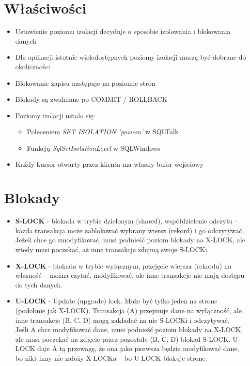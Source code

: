 \documentclass[a4paper,twoside]{article}
\begin{document}
  \section*{Właściwości}
      \begin{itemize}
      \item Ustawienie poziomu izolacji decyduje o sposobie izolowania i blokowania danych 
      \item Dla aplikacji istotnie wielodostępnych poziomy izolacji muszą być dobrane do okoliczności 
      \item Blokowanie zapisu następuje na poziomie stron 
      \item Blokady są zwalniane po COMMIT / ROLLBACK 
      \item Poziomy izolacji ustala się:
      \begin{itemize}
          \item Poleceniem \emph{SET ISOLATION 'poziom'} w SQLTalk 
          \item Funkcją \emph{SqlSetIsolationLevel} w SQLWindows
      \end{itemize}
      \item Każdy kursor otwarty przez klienta ma własny bufor wejściowy
      \end{itemize}

  \section*{Blokady}				
      \begin{itemize}
      \item \textbf{S-LOCK} - blokada w trybie dzielonym (shared), współdzielenie odczytu – każda transakcja może zablokować wybrany wiersz (rekord) i go odczytywać, Jeżeli chce go zmodyfikować, musi podnieść poziom blokady na X-LOCK, ale wtedy musi poczekać, aż inne transakcje zdejmą swoje S-LOCKi.
      \item \textbf{X-LOCK} - blokada w trybie wyłącznym, przejęcie wiersza (rekordu) na własność – można czytać, modyfikować, ale inne transakcje nie mają dostępu do tych danych.
      \item \textbf{U-LOCK} - Update (upgrade) lock. Może być tylko jeden na strone (podobnie jak X-LOCK). Transakcja (A) przejmuje dane na wyłączność, ale inne transakcje (B, C, D) mogą zakładać na nie S-LOCKi i odczytywać. \\ Jeśli A chce modyfikować dane, musi podnieść poziom blokady na X-LOCK, ale musi poczekać na zdjęcie przez pozostałe (B, C, D) blokad S-LOCK. U-LOCK daje A tą przewagę, że ona jako pierwsza będzie modyfikować dane, bo nikt inny nie założy X-LOCKa – bo U-LOCK blokuje strone.
      \end{itemize}
\end{document}
